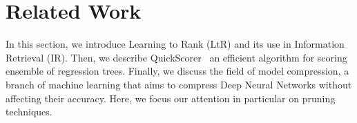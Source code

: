 
\section{Related Work}
\label{sec:related}

In this section, we introduce Learning to Rank (LtR) and its use in Information Retrieval (IR). Then, we describe QuickScorer~\cite{lucchese2015quickscorer,dato2016fast,8035185} an efficient algorithm for scoring ensemble of regression trees. Finally, we discuss the field of model compression, a branch of machine learning that aims to compress Deep Neural Networks without affecting their accuracy. Here, we focus our attention in particular on pruning techniques.

